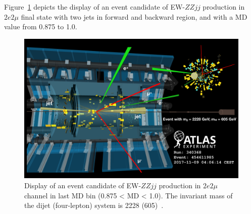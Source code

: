 Figure~\ref{fig:event_display} depicts the display of an event candidate of EW-$ZZjj$ production in $2e2\mu$ final state with two jets in forward and backward region, and with a MD value from 0.875 to 1.0.
\begin{figure}[!htbp]
\begin{center}
\includegraphics[width=1.0\textwidth]{figures/VBSZZ/fit/resize_340368_454611985_v3.pdf}
\end{center}
\caption{Display of an event candidate of EW-$ZZjj$ production in $2e2\mu$ channel in last MD bin (0.875 < MD < 1.0).
         The invariant mass of the dijet (four-lepton) system is 2228 (605)~\gev. }
\label{fig:event_display}
\end{figure}
